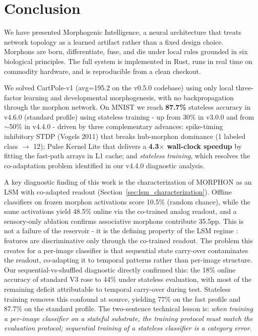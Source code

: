 \section{Conclusion}
\label{sec:conclusion}

We have presented Morphogenic Intelligence, a neural architecture that treats network topology as a learned artifact rather than a fixed design choice. Morphons are born, differentiate, fuse, and die under local rules grounded in six biological principles. The full system is implemented in Rust, runs in real time on commodity hardware, and is reproducible from a clean checkout.

We solved CartPole-v1 (avg=195.2 on the v0.5.0 codebase) using only local three-factor learning and developmental morphogenesis, with no backpropagation through the morphon network. On MNIST we reach \textbf{87.7\%} stateless accuracy in v4.6.0 (standard profile) using stateless training - up from 30\% in v3.0.0 and from $\sim$50\% in v4.4.0 - driven by three complementary advances: spike-timing inhibitory STDP (Vogels 2011) that breaks hub-morphon dominance (1 labeled class $\rightarrow$ 12); Pulse Kernel Lite that delivers a \textbf{4.3$\times$ wall-clock speedup} by fitting the fast-path arrays in L1 cache; and \emph{stateless training}, which resolves the co-adaptation problem identified in our v4.4.0 diagnostic analysis.

A key diagnostic finding of this work is the characterization of MORPHON as an LSM with co-adapted readout (Section~\ref{sec:lsm_characterization}). Offline classifiers on frozen morphon activations score 10.5\% (random chance), while the same activations yield 48.5\% online via the co-trained analog readout, and a sensory-only ablation confirms associative morphons contribute 35.5pp. This is not a failure of the reservoir - it is the defining property of the LSM regime \cite{maass2002real}: features are discriminative only through the co-trained readout. The problem this creates for a per-image classifier is that sequential state carry-over contaminates the readout, co-adapting it to temporal patterns rather than per-image structure. Our sequential-vs-shuffled diagnostic directly confirmed this: the 18\% online accuracy of standard V3 rose to 44\% under stateless evaluation, with most of the remaining deficit attributable to temporal carry-over during test. Stateless training removes this confound at source, yielding 77\% on the fast profile and 87.7\% on the standard profile. The two-sentence technical lesson is: \emph{when training a per-image classifier on a stateful substrate, the training protocol must match the evaluation protocol; sequential training of a stateless classifier is a category error}.

